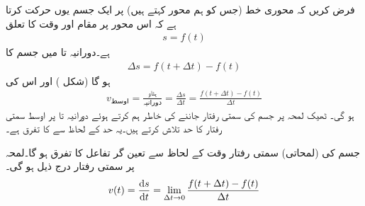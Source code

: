 فرض کریں کہ محوری خط (جس کو ہم  محور کہتے ہیں)  پر ایک جسم یوں حرکت کرتا ہے کہ اس محور پر مقام  اور وقت  کا تعلق 
\begin{align*}
s=f(t)
\end{align*}
ہے۔دورانیہ  تا  میں جسم کا 
\begin{align*}
\Delta s=f(t+\Delta t)-f(t)
\end{align*}
ہو گا (شکل ) اور اس کی 
\begin{align*}
v_{\text{اوسط}}=\frac{\text{ہٹاو}}{\text{دورانیہ}}=\frac{\Delta s}{\Delta t}=\frac{f(t+\Delta t)-f(t)}{\Delta t}
\end{align*}
ہو گی۔ ٹھیک لمحہ  پر جسم کی سمتی رفتار جاننے کی خاطر ہم  کرتے ہوئے دورانیہ  تا  پر اوسط سمتی رفتار کا حد تلاش کرتے ہیں۔یہ حد  کے لحاظ سے  کا تفرق ہے۔

جسم کی (لمحاتی) سمتی رفتار وقت کے لحاظ سے تعین گر تفاعل  کا تفرق ہو گا۔لمحہ  پر سمتی رفتار درج ذیل ہو گی۔
\begin{align*}
v(t)=\frac{\dif s}{\dif t}=\lim_{\Delta t\to 0}\frac{f(t+\Delta t)-f(t)}{\Delta t}
\end{align*} 

